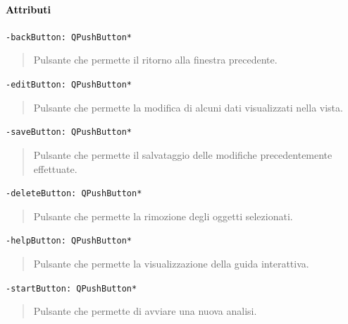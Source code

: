 \paragraph{\textcolor{black}{Attributi\\}}
\color{teal}\verb!-backButton: QPushButton*!
\begin{quote}
\color{black}Pulsante che permette il ritorno alla finestra precedente.
\end{quote}
\color{teal}\verb!-editButton: QPushButton*!
\begin{quote}
\color{black}Pulsante che permette la modifica di alcuni dati visualizzati nella vista.
\end{quote}
\color{teal}\verb!-saveButton: QPushButton*!
\begin{quote}
\color{black}Pulsante che permette il salvataggio delle modifiche precedentemente effettuate.
\end{quote}
\color{teal}\verb!-deleteButton: QPushButton*!
\begin{quote}
\color{black}Pulsante che permette la rimozione degli oggetti selezionati.
\end{quote}
\color{teal}\verb!-helpButton: QPushButton*!
\begin{quote}
\color{black}Pulsante che permette la visualizzazione della guida interattiva.
\end{quote}
\color{teal}\verb!-startButton: QPushButton*!
\begin{quote}
\color{black}Pulsante che permette di avviare una nuova analisi.
\end{quote}
